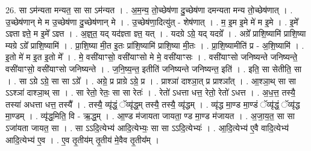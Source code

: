 \documentclass[17pt]{extarticle}
\begin{document}
26. सा ऽम॑न्यता मन्यत॒ सा सा ऽम॑न्यत । . अ॒म॒न्य॒ तो॒च्छेष॑णा दु॒च्छेष॑णा दमन्यता मन्य तो॒च्छेष॑णात् । . उ॒च्छेष॑णान् मे म उ॒च्छेष॑णा दु॒च्छेष॑णान् मे । . उ॒च्छेष॑णा॒दित्यु॑त् - शेष॑णात् । . म॒ इ॒म इ॒मे मे॑ म इ॒मे । . इ॒मे᳚ ऽज्ञ्ता ज्ञ्ते॒ म इ॒मे᳚ ऽज्ञ्त । . अ॒ज्ञ्॒त॒ यद् यद॑ज्ञ्ता ज्ञ्त॒ यत् । . यदग्रे ऽग्रे॒ यद् यदग्रे᳚ । . अग्रे᳚ प्राशि॒ष्यामि॑ प्राशि॒ष्या म्यग्रे ऽग्रे᳚ प्राशि॒ष्यामि॑ । . प्रा॒शि॒ष्या मी॒त इ॒तः प्रा॑शि॒ष्यामि॑ प्राशि॒ष्या मी॒तः । . प्रा॒शि॒ष्यामीति॑ प्र - अ॒शि॒ष्यामि॑ । . इ॒तो मे॑ म इ॒त इ॒तो मे᳚ । . मे॒ वसी॑याꣳसो॒ वसी॑याꣳसो मे मे॒ वसी॑याꣳसः । . वसी॑याꣳसो जनिष्यन्ते जनिष्यन्ते॒ वसी॑याꣳसो॒ वसी॑याꣳसो जनिष्यन्ते । . ज॒नि॒ष्य॒न्त॒ इतीति॑ जनिष्यन्ते जनिष्यन्त॒ इति॑ । . इति॒ सा सेतीति॒ सा । . सा ऽग्रे ऽग्रे॒ सा सा ऽग्रे᳚ । . अग्रे॒ प्र प्राग्रे ऽग्रे॒ प्र । . प्राश्ञा॑ दाश्ञा॒त् प्र प्राश्ञा᳚त् । . आ॒श्ञा॒थ् सा सा ऽऽश्ञा॑ दाश्ञा॒थ् सा । . सा रेतो॒ रेतः॒ सा सा रेतः॑ । . रेतो॑ ऽधत्ता धत्त॒ रेतो॒ रेतो॑ ऽधत्त । . अ॒ध॒त्त॒ तस्यै॒ तस्या॑ अधत्ता धत्त॒ तस्यै᳚ । . तस्यै॒ व्यृ॑द्धं॒ ॅव्यृ॑द्ध॒म् तस्यै॒ तस्यै॒ व्यृ॑द्धम् । . व्यृ॑द्ध मा॒ण्ड मा॒ण्डं ॅव्यृ॑द्धं॒ ॅव्यृ॑द्ध मा॒ण्डम् । . व्यृ॑द्ध॒मिति॒ वि - ऋ॒द्ध॒म् । . आ॒ण्ड म॑जायता जायता॒ ण्ड मा॒ण्ड म॑जायत । . अ॒जा॒य॒त॒ सा सा ऽजा॑यता जायत॒ सा । . सा ऽऽदि॒त्येभ्य॑ आदि॒त्येभ्यः॒ सा सा ऽऽदि॒त्येभ्यः॑ । . आ॒दि॒त्येभ्य॑ ए॒वै वादि॒त्येभ्य॑ आदि॒त्येभ्य॑ ए॒व । . ए॒व तृ॒तीय॑म् तृ॒तीय॑ मे॒वैव तृ॒तीय᳚म् । \newline
\end{document}
